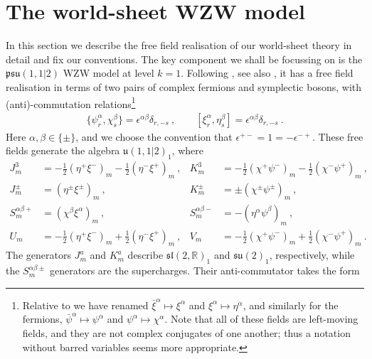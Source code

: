 \documentclass[a4paper,11pt]{article}
\numberwithin{equation}{section}
\begin{document}
\section{The world-sheet WZW model}\label{sec:WZW}

In this section we describe the free field realisation of our world-sheet theory in detail and fix our conventions. The key component we shall be focussing on is the $\mathfrak{psu}(1,1|2)$ WZW model at level $k=1$. Following \cite{Eberhardt:2018ouy}, see also \cite{Lesage:2002ch,Gotz:2006qp,Ridout:2010jk,Quella:2013oda}, it has a free field realisation 
in terms of two pairs of complex fermions and symplectic bosons, with (anti)-commutation relations\footnote{Relative to \cite{Eberhardt:2018ouy} we have renamed $\bar{\xi}^\alpha \mapsto \xi^\alpha$ and $\xi^\alpha \mapsto \eta^\alpha$, and similarly for the fermions, 
$\bar\psi^\alpha \mapsto \psi^\alpha$ and $\psi^\alpha\mapsto \chi^\alpha$. Note that all of these fields are left-moving fields, and they are not complex conjugates of one another; thus a notation without barred variables seems more appropriate.}
\begin{align}
\{\psi^\alpha_r,\chi^\beta_s\}=\epsilon^{\alpha\beta} \delta_{r, -s}\ , \qquad [\xi^\alpha_r,\eta^\beta_s]=\epsilon^{\alpha\beta} \delta_{r,-s}\ .
\end{align}
Here $\alpha,\beta\in\{\pm\}$, and we choose the convention that $\epsilon^{+-}=1 = - \epsilon^{-+}$. These free fields generate the algebra $\mathfrak{u}(1,1|2)_1$, where 
\begin{subequations}
\begin{align}
J^3_m&=-\tfrac{1}{2} (\eta^+\xi^-)_m-\tfrac{1}{2} (\eta^-\xi^+)_m\ , & K^3_m&=-\tfrac{1}{2} (\chi^+\psi^-)_m-\tfrac{1}{2} (\chi^-\psi^+)_m\ , \\
J^\pm_m&=(\eta^\pm\xi^\pm)_m\ , & K^\pm_m&=\pm(\chi^\pm\psi^\pm)_m\ , \\
S_m^{\alpha\beta+}&=(\chi^\beta \xi^\alpha)_m\ , & S_m^{\alpha\beta-}&=-(\eta^\alpha\psi^\beta)_m \ ,  \\
U_m&=-\tfrac{1}{2} (\eta^+\xi^-)_m+\tfrac{1}{2} (\eta^-\xi^+)_m\ , & V_m&=-\tfrac{1}{2} (\chi^+\psi^-)_m+\tfrac{1}{2} (\chi^-\psi^+)_m\ .
\end{align}\label{eq:u112-algebra}
\end{subequations}
The generators $J^a_m$ and $K^a_m$ describe $\mathfrak{sl}(2,\mathds{R})_1$ and $\mathfrak{su}(2)_1$, respectively, while the $S_m^{\alpha\beta\pm}$ generators are the supercharges. Their anti-commutator takes the form 
\end{document}
